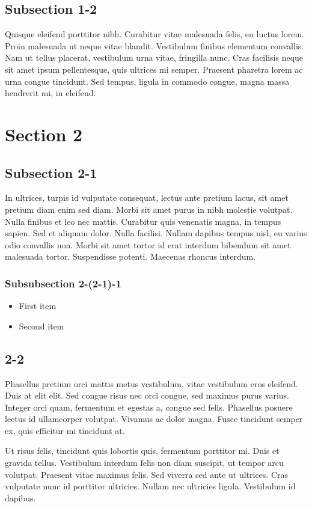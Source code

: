 \subsection{Subsection 1-2}
Quisque eleifend porttitor nibh. Curabitur vitae malesuada felis, eu luctus lorem. Proin malesuada ut neque vitae blandit. Vestibulum finibus elementum convallis. Nam ut tellus placerat, vestibulum urna vitae, fringilla nunc. Cras facilisis neque sit amet ipsum pellentesque, quis ultrices mi semper. Praesent pharetra lorem ac urna congue tincidunt. Sed tempus, ligula in commodo congue, magna massa hendrerit mi, in eleifend.

\section{Section 2}
\subsection{Subsection 2-1}
In ultrices, turpis id vulputate consequat, lectus ante pretium lacus, sit amet pretium diam enim sed diam. Morbi sit amet purus in nibh molestie volutpat. Nulla finibus et leo nec mattis. Curabitur quis venenatis magna, in tempus sapien. Sed et aliquam dolor. Nulla facilisi. Nullam dapibus tempus nisl, eu varius odio convallis non. Morbi sit amet tortor id erat interdum bibendum sit amet malesuada tortor. Suspendisse potenti. Maecenas rhoncus interdum.

\subsubsection{Subsubsection 2-(2-1)-1}
  \begin{itemize}
    \item First item
    \item Second item
  \end{itemize}

\subsection{2-2}
Phasellus pretium orci mattis metus vestibulum, vitae vestibulum eros eleifend. Duis at elit elit. Sed congue risus nec orci congue, sed maximus purus varius. Integer orci quam, fermentum et egestas a, congue sed felis. Phasellus posuere lectus id ullamcorper volutpat. Vivamus ac dolor magna. Fusce tincidunt semper ex, quis efficitur mi tincidunt at.

Ut risus felis, tincidunt quis lobortis quis, fermentum porttitor mi. Duis et gravida tellus. Vestibulum interdum felis non diam suscipit, ut tempor arcu volutpat. Praesent vitae maximus felis. Sed viverra sed ante ut ultrices. Cras vulputate nunc id porttitor ultricies. Nullam nec ultricies ligula. Vestibulum id dapibus.
